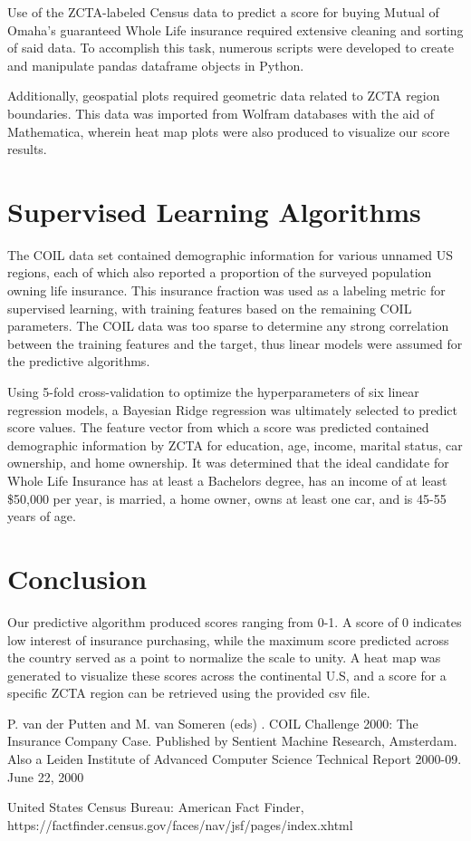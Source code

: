 \documentclass[12pt]{article}
\begin{document}
Use of the ZCTA-labeled Census data to predict a score for buying Mutual of Omaha's guaranteed Whole Life insurance required extensive cleaning and sorting of said data.  To accomplish this task, numerous scripts were developed to create and manipulate pandas dataframe objects in Python.

Additionally, geospatial plots required geometric data related to ZCTA region boundaries.  This data was imported from Wolfram databases with the aid of Mathematica, wherein heat map plots were also produced to visualize our score results.

\section{Supervised Learning Algorithms}
The COIL data set contained demographic information for various unnamed US regions, each of which also reported a proportion of the surveyed population owning life insurance.  This insurance fraction was used as a labeling metric for supervised learning, with training features based on the remaining COIL parameters.  The COIL data was too sparse to determine any strong correlation between the training features and the target, thus linear models were assumed for the predictive algorithms.

Using 5-fold cross-validation to optimize the hyperparameters of six linear regression models, a Bayesian Ridge regression was ultimately selected to predict score values.  The feature vector from which a score was predicted contained demographic information by ZCTA for education, age, income, marital status, car ownership, and home ownership.  It was determined that the ideal candidate for Whole Life Insurance has at least a Bachelors degree, has an income of at least \$50,000 per year, is married, a home owner, owns at least one car, and is 45-55 years of age.


\section{Conclusion}
Our predictive algorithm produced scores ranging from 0-1.  A score of 0 indicates low interest of insurance purchasing, while the maximum score predicted across the country served as a point to normalize the scale to unity.  A heat map was generated to visualize these scores across the continental U.S, and a score for a specific ZCTA region can be retrieved using the provided csv file.

\begin{thebibliography}{9}

P. van der Putten and M. van Someren (eds) . COIL Challenge 2000: The Insurance Company Case. Published by Sentient Machine Research, Amsterdam. Also a Leiden Institute of Advanced Computer Science Technical Report 2000-09. June 22, 2000

United States Census Bureau: American Fact Finder,\\ https://factfinder.census.gov/faces/nav/jsf/pages/index.xhtml

\end{thebibliography}
\end{document}
